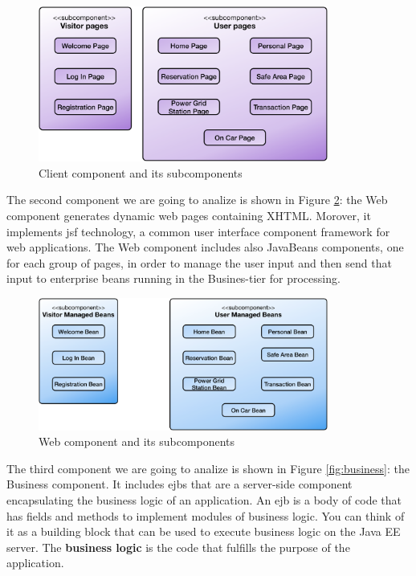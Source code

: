 \vspace{52pt}
\begin{figure}[htbp]
\centering
\includegraphics[width=0.85\textwidth]{Images/ClientComponent.pdf}
\vspace{10pt}
\caption{Client component and its subcomponents}
\label{fig:client}
\end{figure}
\clearpage

\newline
The second component we are going to analize is shown in Figure \ref{fig:web}: the Web component generates dynamic web pages containing XHTML. Morover, it implements \acl{jsf} technology, a common user interface component framework for web applications.
The Web component includes also JavaBeans components, one for each group of pages, in order to manage the user input and then send that input to enterprise beans running in the Busines-tier for processing.

\vspace{104pt}
\begin{figure}[htbp]
\centering
\includegraphics[width=0.85\textwidth]{Images/WebComponent.pdf}
\vspace{10pt}
\caption{Web component and its subcomponents}
\label{fig:web}
\end{figure}
\clearpage

\newline
The third component we are going to analize is shown in Figure \ref{fig:business}: the Business component. It includes \acl{ejb}s that are a server-side component encapsulating the business logic of an application. An \acs{ejb} is a body of code that has fields and methods to implement modules of business logic. You can think of it as a building block that can be used to execute business logic on the Java EE server.
The \textbf{business logic} is the code that fulfills the purpose of the application.

